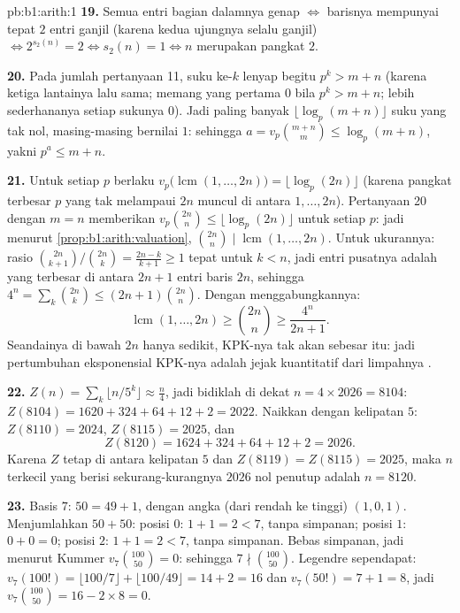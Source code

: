 \begin{solution}{pb:b1:arith:1}
\textbf{19.} Semua entri bagian dalamnya genap $\iff$ barisnya mempunyai tepat
$2$ entri ganjil (karena kedua ujungnya selalu ganjil) $\iff 2^{s_2(n)} =
2 \iff s_2(n) = 1 \iff n$ merupakan pangkat $2$.

\textbf{20.} Pada jumlah pertanyaan 11, suku ke-$k$ lenyap begitu
$p^k > m + n$ (karena ketiga lantainya lalu sama; memang yang
pertama $0$ bila $p^k > m+n$; lebih sederhananya setiap sukunya $0$).
Jadi paling banyak $\lfloor \log_p(m+n)\rfloor$ suku yang tak nol, masing-masing
bernilai $1$: sehingga $a = v_p\binom{m+n}m \leq \log_p(m+n)$, yakni $p^a \leq
m + n$.

\textbf{21.} Untuk setiap  $p$ berlaku $v_p\bigl(\operatorname{lcm}(1,
\dots, 2n)\bigr) = \lfloor\log_p(2n)\rfloor$ (karena pangkat terbesar
$p$ yang tak melampaui $2n$ muncul di antara $1, \dots, 2n$). Pertanyaan 20
dengan $m = n$ memberikan $v_p\binom{2n}n \leq \lfloor\log_p(2n)\rfloor$
untuk setiap $p$: jadi menurut \cref{prop:b1:arith:valuation}, $\binom{2n}n
\mid \operatorname{lcm}(1, \dots, 2n)$. Untuk ukurannya: rasio
$\binom{2n}{k+1}/\binom{2n}k = \frac{2n-k}{k+1} \geq 1$ tepat
untuk $k < n$, jadi entri pusatnya adalah yang terbesar di antara $2n + 1$
entri baris $2n$, sehingga $4^n = \sum_k \binom{2n}k \leq
(2n+1)\binom{2n}n$. Dengan menggabungkannya:
\[
\operatorname{lcm}(1, \dots, 2n) \geq \binom{2n}n \geq
\frac{4^n}{2n + 1} .
\]
Seandainya  di bawah $2n$ hanya sedikit, KPK-nya tak akan sebesar
itu: jadi pertumbuhan eksponensial KPK-nya adalah jejak kuantitatif dari
limpahnya .

\textbf{22.} $Z(n) = \sum_k\lfloor n/5^k\rfloor \approx \frac
n4$, jadi bidiklah di dekat $n = 4 \times 2026 = 8104$: $Z(8104) = 1620 +
324 + 64 + 12 + 2 = 2022$. Naikkan dengan kelipatan $5$: $Z(8110)
= 2024$, $Z(8115) = 2025$, dan
\[
Z(8120) = 1624 + 324 + 64 + 12 + 2 = 2026 .
\]
Karena $Z$ tetap di antara kelipatan $5$ dan $Z(8119) =
Z(8115) = 2025$, maka $n$ terkecil yang berisi sekurang-kurangnya $2026$ nol
penutup adalah $n = 8120$.

\textbf{23.} Basis $7$: $50 = 49 + 1$, dengan angka (dari rendah ke tinggi) $(1, 0,
1)$. Menjumlahkan $50 + 50$: posisi $0$: $1 + 1 = 2 < 7$, tanpa simpanan;
posisi $1$: $0 + 0 = 0$; posisi $2$: $1 + 1 = 2 < 7$, tanpa
simpanan. Bebas simpanan, jadi menurut Kummer $v_7\binom{100}{50} = 0$: sehingga $7 \nmid
\binom{100}{50}$. Legendre sependapat: $v_7(100!) = \lfloor 100/7
\rfloor + \lfloor 100/49 \rfloor = 14 + 2 = 16$ dan $v_7(50!) = 7
+ 1 = 8$, jadi $v_7\binom{100}{50} = 16 - 2\times8 = 0$.


\end{solution}
